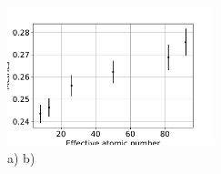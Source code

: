 \documentclass[a4paper]{panl}
\begin{document}
\begin{figure}[t]
    \begin{center}
        \includegraphics[width=60mm]{figures/diffmat1.pdf} 
 
        \vspace{-3mm}
        \caption{a) b)}
    \end{center}
    \vspace{-5mm}
\end{figure}
\end{document}

